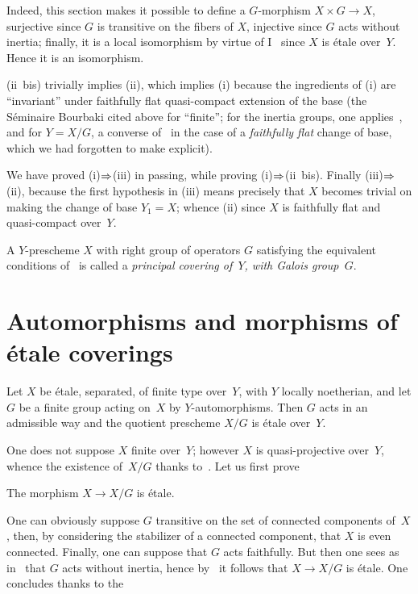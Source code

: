 Indeed, this section makes it possible to define a $G$-morphism $X
\times G \to X$, surjective since $G$ is transitive on the fibers of
$X$, injective since $G$ acts without inertia; finally, it is a
local isomorphism by virtue of I~ since $X$ is \'etale
over~$Y$. Hence it is an isomorphism.

(ii~bis)
trivially implies (ii), which implies (i) because the ingredients
of (i) are ``invariant'' under faithfully flat
quasi-compact extension of the base (\cf the S\'eminaire Bourbaki cited
above for ``finite''; for the inertia groups, one
applies~, and for $Y=X/G$, a converse
of~ in the case of a \emph{faithfully flat} change of base,
which we had forgotten to make explicit).

We have proved (i)$\To$(iii) in passing, while proving
(i)$\To$(ii~bis). Finally (iii)$\To$(ii), because the
first hypothesis in (iii) means precisely that
$X$ becomes trivial on making the change of base $Y_1=X$; whence
(ii) since $X$ is faithfully flat and quasi-compact over~$Y$.

\begin{definition}
\label{V.2.8} A $Y$-prescheme $X$ with right group
of operators $G$ satisfying the
equivalent conditions of~ is called a \emph{principal
covering of~$Y$, with Galois group~$G$}.
\end{definition}

\section{Automorphisms and morphisms of \'etale coverings}
\label{V.3}

\begin{proposition}
\label{V.3.1} Let $X$ be \'etale, separated, of finite type over~$Y$, with $Y$ locally noetherian, and let $G$ be a finite group acting on~$X$ by $Y$-automorphisms. Then $G$ acts in an
admissible way and the quotient prescheme $X/G$ is \'etale over~$Y$.
\end{proposition}

One does not suppose $X$ finite over~$Y$; however $X$ is quasi-projective
over~$Y$, whence the existence of~$X/G$ thanks
to~. Let us first prove

\begin{corollary}
\label{V.3.2} The morphism $X \to X/G$ is \'etale.
\end{corollary}

One can obviously suppose $G$ transitive on the set of
connected components of~$X$, then, by considering the
stabilizer of a connected component, that $X$ is even
connected. Finally, one can suppose that $G$ acts faithfully.
But then one sees as in~ that $G$ acts without
inertia, hence by~ it follows that $X \to X/G$ is
\'etale. One concludes thanks to the

